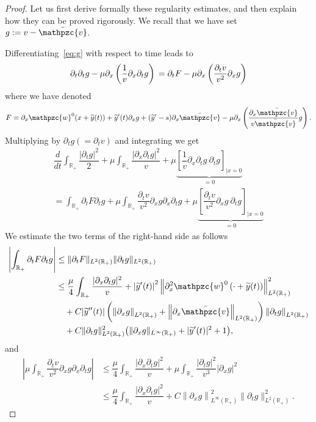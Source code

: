 \documentclass[AHL,Unicode,longabstracts,published]{cedram}
\newcommand{\R}{\mathbb{R}}
\newcommand{\p}{\partial}
\newcommand{\bv}{\bar{\mathpzc{v}}}
\newcommand{\tw}{\mathpzc{w}}
\newcommand{\ty}{\widetilde{y}}
\begin{document}
\begin{proof}
Let us first derive formally these regularity estimates, and then explain how they can be proved rigorously. We recall that we have set $g:=v-\bv$.

Differentiating~\eqref{eq:g} with respect to time leads to
\begin{equation}\label{eq:dt2-v}
\partial_t \partial_t g - \mu \partial_{x} \left(\dfrac{1}{v} \partial_x \partial_t g \right) \\
= \partial_t F - \mu \partial_x \left(\dfrac{\partial_t v}{v^2} \partial_xg \right)
\end{equation}
where we have denoted
\begin{equation}\label{eq:F}
F = \partial_x \tw^0(x+\ty(t)) + \ty'(t) \partial_x g + (\ty'-s)\partial_x \bv - \mu \partial_{x} \left(\dfrac{\partial_x \bv }{v \bv} g\right).
\end{equation}
Multiplying by $\partial_t g(=\p_t v)$ and integrating we get
\begin{multline*}
 \dfrac{d}{dt} \int_{\R_+} \dfrac{|\partial_tg|^2}{2} + \mu \int_{\R_+} \dfrac{|\partial_x \partial_t g|^2}{v} + \mu \underset{=0}{\underbrace{\left[\dfrac{1}{v}\partial_x \partial_t g \ \partial_t g \right]_{|x=0}}} \\
= \int_{\R_+} \partial_t F \partial_tg + \mu \int_{\R_+}\dfrac{\partial_t v}{v^2}\partial_xg \partial_x \partial_tg + \mu \underset{=0}{\underbrace{\left[\dfrac{\partial_t v}{v^2}\partial_x g \ \partial_t g \right]_{|x=0}}}
\end{multline*}
We estimate the two terms of the right-hand side as follows
\begin{align*}
\left|\int_{\R_+} \partial_t F \partial_tg\right| & \leq \|\partial_t F\|_{L^2(\R_+)} \| \partial_tg\|_{L^2(\R_+)} \\
& \leq \dfrac{\mu}{4} \int_{\R_+} \dfrac{|\partial_x \partial_t g|^2}{v} + \left|\ty'(t)\right|^2 \left\|\partial^2_x \tw^0\left(\cdot + \ty(t)\right)\right\|_{L^2(\R_+)}^2 \\
& \quad + C|\ty''(t)|\left(\left\|\p_x g\right\|_{L^2(\R_+)} + \left\|\p_x \bv\right\|_{L^2(\R_+)}\right)\left\|\p_t g\right\|_{L^2(\R_+)}\\
& \quad + C \|\partial_t g\|_{L^2(\R_+)}^2 \big(\|\partial_x g\|_{L^\infty(\R_+)} +|\ty'(t)|^2 + 1\big),
\end{align*}
and
\begin{align*}
\left|\mu \int_{\R_+}\dfrac{\partial_t v}{v^2}\partial_xg \partial_x \partial_tg\right| & \leq \dfrac{\mu}{4} \int_{\R_+} \dfrac{|\partial_x \partial_t g|^2}{v} + \mu \int_{\R_+} \dfrac{|\partial_t g|^2}{v^3} |\partial_x g|^2 \\
& \leq \dfrac{\mu}{4} \int_{\R_+} \dfrac{|\partial_x \partial_t g|^2}{v} + C \left\|\partial_xg\right\|_{L^\infty(\R_+)}^2 \|\partial_tg\|_{L^2(\R_+)}^2.
\end{align*}


\end{proof}
\end{document}
